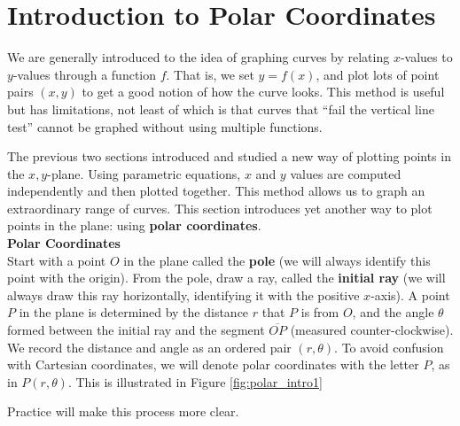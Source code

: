 \section{Introduction to Polar Coordinates}\label{sec:polar}

We are generally introduced to the idea of graphing curves by relating $x$-values to $y$-values through a function $f$. That is, we set $y=f(x)$, and plot lots of point pairs $(x,y)$ to get a good notion of how the curve looks. This method is useful but has limitations, not least of which is that curves that ``fail the vertical line test'' cannot be graphed without using multiple functions.

The previous two sections introduced and studied a new way of plotting points in the $x,y$-plane. Using parametric equations, $x$ and $y$ values are computed independently and then plotted together. This method allows us to graph an extraordinary range of curves. This section introduces yet another way to plot points in the plane: using \textbf{polar coordinates}. \\

\noindent\textbf{\large Polar Coordinates}\\

Start with a point $O$ in the plane called the \textbf{pole} (we will always identify this point with the origin). From the pole, draw a ray, called the \textbf{initial ray} (we will always draw this ray horizontally, identifying it with the positive $x$-axis). A point $P$ in the plane is determined by the distance $r$ that $P$ is from $O$, and the angle $\theta$ formed between the initial ray and the segment $\overline{OP}$ (measured counter-clockwise). We record the distance and angle as an ordered pair $(r,\theta)$. To avoid confusion with Cartesian coordinates, we will denote polar coordinates with the letter $P$, as in $P(r,\theta)$. This is illustrated in Figure \ref{fig:polar_intro1}


Practice will make this process more clear.\\

